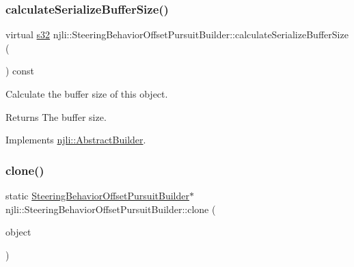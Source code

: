 \mbox{\label{classnjli_1_1_steering_behavior_offset_pursuit_builder_ae4cdd2d031be57550b1e0fc763013558}} 
\subsubsection{\texorpdfstring{calculate\+Serialize\+Buffer\+Size()}{calculateSerializeBufferSize()}}
{\footnotesize\ttfamily virtual \mbox{\hyperlink{_util_8h_aa62c75d314a0d1f37f79c4b73b2292e2}{s32}} njli\+::\+Steering\+Behavior\+Offset\+Pursuit\+Builder\+::calculate\+Serialize\+Buffer\+Size (\begin{DoxyParamCaption}{ }\end{DoxyParamCaption}) const\hspace{0.3cm}{\ttfamily [virtual]}}

Calculate the buffer size of this object.

\begin{DoxyReturn}{Returns}
The buffer size. 
\end{DoxyReturn}


Implements \mbox{\hyperlink{classnjli_1_1_abstract_builder_aa1d220053e182c37b31b427499c6eacf}{njli\+::\+Abstract\+Builder}}.

\mbox{\label{classnjli_1_1_steering_behavior_offset_pursuit_builder_ac17b77c260ac5c1b03ff2cafc215bd3b}} 
\subsubsection{\texorpdfstring{clone()}{clone()}}
{\footnotesize\ttfamily static \mbox{\hyperlink{classnjli_1_1_steering_behavior_offset_pursuit_builder}{Steering\+Behavior\+Offset\+Pursuit\+Builder}}$\ast$ njli\+::\+Steering\+Behavior\+Offset\+Pursuit\+Builder\+::clone (\begin{DoxyParamCaption}\item[{const \mbox{\hyperlink{classnjli_1_1_steering_behavior_offset_pursuit_builder}{Steering\+Behavior\+Offset\+Pursuit\+Builder}} \&}]{object }\end{DoxyParamCaption})\hspace{0.3cm}{\ttfamily [static]}}

